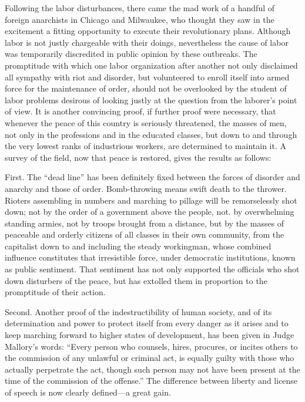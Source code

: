 \documentclass[11pt,openany]{book}
\begin{document}
Following the labor disturbances, there came the mad work of a handful of foreign anarchists in Chicago and Milwaukee, who thought they saw in the excitement a fitting opportunity to execute their revolutionary plans. Although labor is not justly chargeable with their doings, nevertheless the cause of labor was temporarily discredited in public opinion by these outbreaks. The promptitude with which one labor organization after another not only disclaimed all sympathy with riot and disorder, but volunteered to enroll itself into armed force for the maintenance of order, should not be overlooked by the student of labor problems desirous of looking justly at the question from the laborer's point of view. It is another convincing proof, if further proof were necessary, that whenever the peace of this country is seriously threatened, the masses of men, not only in the professions and in the educated classes, but down to and through the very lowest ranks of industrious workers, are determined to maintain it. A survey of the field, now that peace is restored, gives the results as follows:

First. The ``dead line'' has been definitely fixed between the forces of disorder and anarchy and those of order. Bomb-throwing means swift death to the thrower. Rioters assembling in numbers and marching to pillage will be remorselessly shot down; not by the order of a government above the people, not. by overwhelming standing armies, not by troops brought from a distance, but by the masses of peaceable and orderly citizens of all classes in their own community, from the capitalist down to and including the steady workingman, whose combined influence constitutes that irresistible force, under democratic institutions, known as public sentiment. That sentiment has not only supported the officials who shot down disturbers of the peace, but has extolled them in proportion to the promptitude of their action.

Second. Another proof of the indestructibility of human society, and of its determination and power to protect itself from every danger as it arises and to keep marching forward to higher states of development, has been given in Judge Mallory's words: ``Every person who counsels, hires, procures, or incites others to the commission of any unlawful or criminal act, is equally guilty with those who actually perpetrate the act, though such person may not have been present at the time of the commission of the offense.'' The difference between liberty and license of speech is now clearly defined---a great gain.
\end{document}
